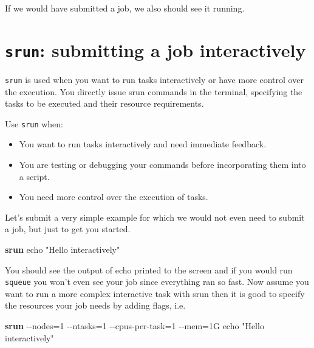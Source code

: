 \documentclass[
  letterpaper,
  DIV=11,
  numbers=noendperiod]{scrreprt}
\newenvironment{Shaded}{}{}
\newcommand{\AttributeTok}[1]{\textcolor[rgb]{0.84,0.23,0.29}{#1}}
\newcommand{\ExtensionTok}[1]{\textcolor[rgb]{0.84,0.23,0.29}{\textbf{#1}}}
\newcommand{\NormalTok}[1]{\textcolor[rgb]{0.14,0.16,0.18}{#1}}
\newcommand{\OperatorTok}[1]{\textcolor[rgb]{0.14,0.16,0.18}{#1}}
\newcommand{\StringTok}[1]{\textcolor[rgb]{0.01,0.18,0.38}{#1}}
\providecommand{\tightlist}{%
  \setlength{\itemsep}{0pt}\setlength{\parskip}{0pt}}\usepackage{longtable,booktabs,array}
\begin{document}
If we would have submitted a job, we also should see it running.

\section{\texorpdfstring{\texttt{srun}: submitting a job
interactively}{srun: submitting a job interactively}}\label{srun-submitting-a-job-interactively}

\texttt{srun} is used when you want to run tasks interactively or have
more control over the execution. You directly issue srun commands in the
terminal, specifying the tasks to be executed and their resource
requirements.

Use \texttt{srun} when:

\begin{itemize}
\tightlist
\item
  You want to run tasks interactively and need immediate feedback.
\item
  You are testing or debugging your commands before incorporating them
  into a script.
\item
  You need more control over the execution of tasks.
\end{itemize}

Let's submit a very simple example for which we would not even need to
submit a job, but just to get you started.

\begin{Shaded}
\begin{Highlighting}[]
\ExtensionTok{srun}\NormalTok{ echo }\StringTok{"Hello interactively"}
\end{Highlighting}
\end{Shaded}

You should see the output of echo printed to the screen and if you would
run \texttt{squeue} you won't even see your job since everything ran so
fast. Now assume you want to run a more complex interactive task with
srun then it is good to specify the resources your job needs by adding
flags, i.e.

\begin{Shaded}
\begin{Highlighting}[]
\ExtensionTok{srun} \AttributeTok{{-}{-}nodes}\OperatorTok{=}\NormalTok{1 }\AttributeTok{{-}{-}ntasks}\OperatorTok{=}\NormalTok{1 }\AttributeTok{{-}{-}cpus{-}per{-}task}\OperatorTok{=}\NormalTok{1 }\AttributeTok{{-}{-}mem}\OperatorTok{=}\NormalTok{1G echo }\StringTok{"Hello interactively"}
\end{Highlighting}
\end{Shaded}
\end{document}
